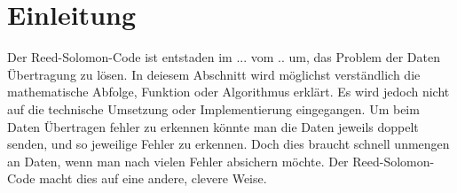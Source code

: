 %
%
%
\section{Einleitung
\label{reedsolomon:section:einleitung}}
Der Reed-Solomon-Code ist entstaden im ... vom .. um,
das Problem der Daten Übertragung zu lösen.
In deiesem Abschnitt wird möglichst verständlich die mathematische Abfolge, Funktion oder Algorithmus erklärt.
Es wird jedoch nicht auf die technische Umsetzung oder Implementierung eingegangen.
Um beim Daten Übertragen fehler zu erkennen könnte man die Daten jeweils doppelt senden,
und so jeweilige Fehler zu erkennen.
Doch dies braucht schnell unmengen an Daten, wenn man nach vielen Fehler absichern möchte.
Der Reed-Solomon-Code macht dies auf eine andere, clevere Weise.



